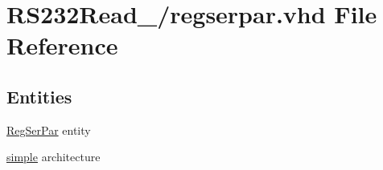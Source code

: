 \hypertarget{16_2regserpar_8vhd}{}\section{R\+S232\+Read\+\_/regserpar.vhd File Reference}
\label{16_2regserpar_8vhd}
\subsection*{Entities}
\begin{DoxyCompactItemize}
\item 
\hyperlink{class_reg_ser_par}{Reg\+Ser\+Par} entity
\item 
\hyperlink{class_reg_ser_par_1_1simple}{simple} architecture
\end{DoxyCompactItemize}
